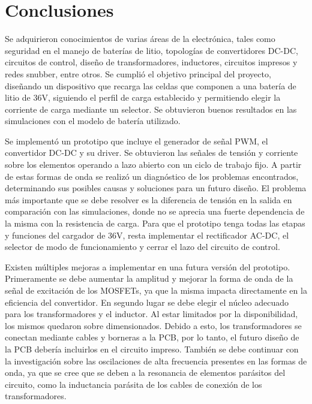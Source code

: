\section{Conclusiones}

  

Se adquirieron conocimientos de varias áreas de la electrónica, tales como seguridad en el manejo de baterías de litio, topologías de convertidores DC-DC, circuitos de control, diseño de transformadores, inductores, circuitos impresos y redes snubber, entre otros.
Se cumplió el objetivo principal del proyecto, diseñando un dispositivo que recarga las celdas que componen a una batería de litio de 36V, siguiendo el perfil de carga establecido y permitiendo elegir la corriente de carga mediante un selector.
Se obtuvieron buenos resultados en las simulaciones con el modelo de batería utilizado. 

Se implementó un prototipo que incluye el generador de señal PWM, el convertidor DC-DC y su driver.
Se obtuvieron las señales de tensión y corriente sobre los elementos operando a lazo abierto con un ciclo de trabajo fijo. 
A partir de estas formas de onda se realizó un diagnóstico de los problemas encontrados, determinando sus posibles causas y soluciones para un futuro diseño. 
El problema más importante que se debe resolver es la diferencia de tensión en la salida en comparación con las simulaciones, donde no se aprecia una fuerte dependencia de la misma con la resistencia de carga.
Para que el prototipo tenga todas las etapas y funciones del cargador de 36V, resta implementar el rectificador AC-DC, el selector de modo de funcionamiento y cerrar el lazo del circuito de control.

Existen múltiples mejoras a implementar en una futura versión del prototipo.
Primeramente se debe aumentar la amplitud y mejorar la forma de onda de la señal de excitación de los MOSFETs, ya que la misma impacta directamente en la eficiencia del convertidor.
En segundo lugar se debe elegir el núcleo adecuado para los transformadores y el inductor. Al estar limitados por la disponibilidad, los mismos quedaron sobre dimensionados. 
Debido a esto, los transformadores se conectan mediante cables y borneras a la PCB, por lo tanto, el futuro diseño de la PCB debería incluirlos en el circuito impreso.
También se debe continuar con la investigación sobre las oscilaciones de alta frecuencia presentes en las formas de onda, ya que se cree que se deben a la resonancia de elementos parásitos del circuito, como la inductancia parásita de los cables de conexión de los transformadores. 